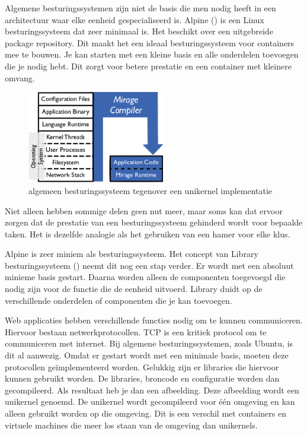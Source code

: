 \documentclass[pdftex,a4paper,12pt,twoside]{report}
\begin{document}
Algemene besturingssystemen zijn niet de basis die men nodig heeft in een architectuur waar elke eenheid gespecialiseerd is. Alpine (\cite{alpine_linux_development_team_alpine_????}) is een Linux besturingssysteem dat zeer minimaal is. Het beschikt over een uitgebreide package repository. Dit maakt het een ideaal besturingssysteem voor containers mee te bouwen. Je kan starten met een kleine basis en alle onderdelen toevoegen die je nodig hebt. Dit zorgt voor betere prestatie en een container met kleinere omvang.

\begin{figure}
    \centering
    \includegraphics[width=6cm]{img/unikernel}
    \caption{algemeen besturingssysteem tegenover een unikernel implementatie \cite{madhavapeddy_unikernels_2013}}
    \label{fig:unikernel}
\end{figure}

Niet alleen hebben sommige delen geen nut meer, maar soms kan dat ervoor zorgen dat de prestatie van een besturingssysteem gehinderd wordt voor bepaalde taken. Het is dezelfde analogie als het gebruiken van een hamer voor elke klus.

Alpine is zeer miniem als besturingssysteem. Het concept van Library besturingssysteem (\cite{madhavapeddy_unikernels_2013}) neemt dit nog een stap verder. Er wordt met een absoluut minieme basis gestart. Daarna worden alleen de componenten toegevoegd die nodig zijn voor de functie die de eenheid uitvoerd. Library duidt op de verschillende onderdelen of componenten die je kan toevoegen.

Web applicaties hebben verschillende functies nodig om te kunnen communiceren. Hiervoor bestaan netwerkprotocollen. TCP is een kritiek protocol om te communiceren met internet. Bij algemene besturingssystemen, zoals Ubuntu, is dit al aanwezig. Omdat er gestart wordt met een minimale basis, moeten deze protocollen geïmplementeerd worden. Gelukkig zijn er libraries die hiervoor kunnen gebruikt worden. De libraries, broncode en configuratie worden dan gecompileerd. Als resultaat heb je dan een afbeelding. Deze afbeelding wordt een unikernel genoemd. De unikernel wordt gecompileerd voor één omgeving en kan alleen gebruikt worden op die omgeving. Dit is een verschil met containers en virtuele machines die meer los staan van de omgeving dan unikernels.
\end{document}
